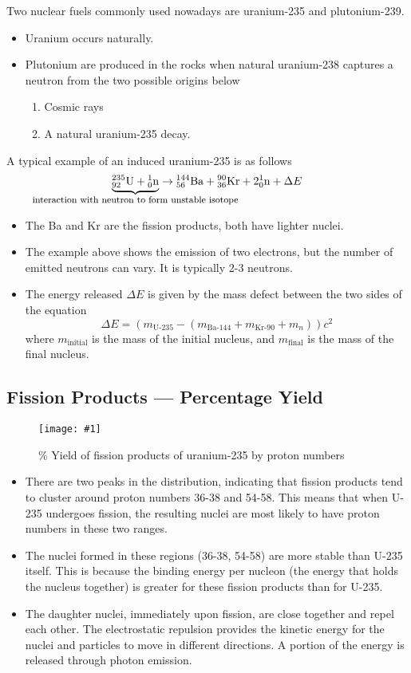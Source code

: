 \documentclass[a4paper,12pt]{article}
\newcommand{\img}[4]{\begin{center}
  \begin{figure}[H]
    \centering
    \texttt{[image: \#1]}
    \caption{#3}
    \label{fig:#4}
  \end{figure}
\end{center}}
\newcommand{\paren}[1]{\left(#1\right)}
\newcommand{\atom}[3]{{}^{#1}_{#2}\text{#3}}
\begin{document}
Two nuclear fuels commonly used nowadays are uranium-235 and plutonium-239.
\begin{itemize}
  \item Uranium occurs naturally.
  \item Plutonium are produced in the rocks when natural uranium-238 captures a neutron from the two possible origins below
        \begin{enumerate}
          \item Cosmic rays
          \item A natural uranium-235 decay.
        \end{enumerate}
\end{itemize}

A typical example of an induced uranium-235 is as follows
$$\underbrace{\atom{235}{92}{U} + \atom{1}{0}{n}}_\text{\makebox[0pt]{\footnotesize{interaction with neutron to form unstable isotope}}} \rightarrow \atom{144}{56}{Ba} + \atom{90}{36}{Kr} + 2\atom{1}{0}{n} + \Delta E$$
\begin{itemize}
  \item The Ba and Kr are the fission products, both have lighter nuclei.
  \item The example above shows the emission of two electrons, but the number of emitted neutrons can vary. It is typically 2-3 neutrons.
  \item The energy released $\Delta E$ is given by the mass defect between the two sides of the equation $$\Delta E = \paren{m_{\text{U-235}} - \paren{m_\text{Ba-144} + m_\text{Kr-90} + m_{n}}}c^2$$
        where $m_{\text{initial}}$ is the mass of the initial nucleus, and $m_{\text{final}}$ is the mass of the final nucleus.
\end{itemize}

\pagebreak

\subsection{Fission Products --- Percentage Yield}

\img{u235g.png}{0.5}{\% Yield of fission products of uranium-235 by proton numbers}{u235g}

\begin{itemize}
  \item There are two peaks in the distribution, indicating that fission products tend to cluster around proton numbers 36-38 and 54-58. This means that when U-235 undergoes fission, the resulting nuclei are most likely to have proton numbers in these two ranges.
  \item The nuclei formed in these regions (36-38, 54-58) are more stable than U-235 itself. This is because the binding energy per nucleon (the energy that holds the nucleus together) is greater for these fission products than for U-235.
  \item The daughter nuclei, immediately upon fission, are close together and repel each other. The electrostatic repulsion provides the kinetic energy for the nuclei and particles to move in different directions. A portion of the energy is released through photon emission.
\end{itemize}
\end{document}
